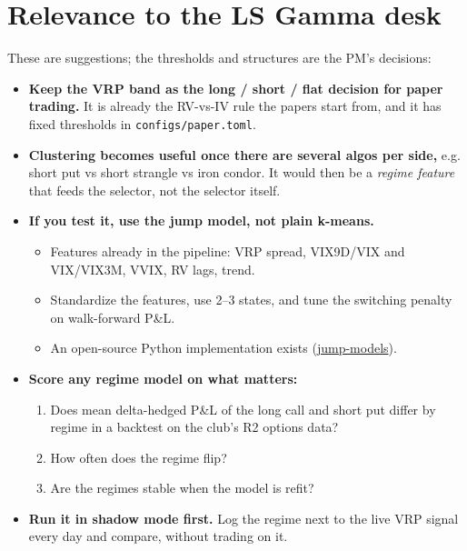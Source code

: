 \documentclass{article}
\begin{document}
\section{Relevance to the LS Gamma desk}

These are suggestions; the thresholds and structures are the PM's decisions:

\begin{itemize}

\item \textbf{Keep the VRP band as the long /\allowbreak{} short /\allowbreak{} flat decision for paper trading.} It is already the RV-vs-IV rule the papers start from, and it has fixed thresholds in \texttt{configs/\allowbreak{}paper.\allowbreak{}toml}.

\item \textbf{Clustering becomes useful once there are several algos per side,} e.g. short put vs short strangle vs iron condor. It would then be a \emph{regime feature} that feeds the selector, not the selector itself.

\item \textbf{If you test it, use the jump model, not plain k-means.}

\begin{itemize}

\item Features already in the pipeline: VRP spread, VIX9D/\allowbreak{}VIX and VIX/\allowbreak{}VIX3M, VVIX, RV lags, trend.

\item Standardize the features, use 2--3 states, and tune the switching penalty on walk-forward P\&L.

\item An open-source Python implementation exists (\href{https://github.com/Yizhan-Oliver-Shu/jump-models}{jump-models}).

\end{itemize}

\item \textbf{Score any regime model on what matters:}

\begin{enumerate}

\item Does mean delta-hedged P\&L of the long call and short put differ by regime in a backtest on the club's R2 options data?

\item How often does the regime flip?

\item Are the regimes stable when the model is refit?

\end{enumerate}

\item \textbf{Run it in shadow mode first.} Log the regime next to the live VRP signal every day and compare, without trading on it.

\end{itemize}
\end{document}
